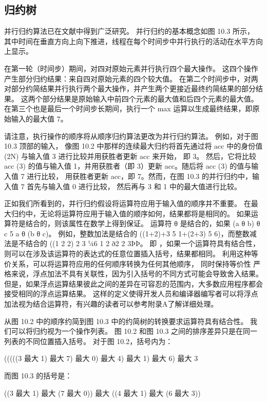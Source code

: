 \subsection{归约树}
并行归约算法已在文献中得到广泛研究。 并行归约的基本概念如图 10.3 所示，
其中时间在垂直方向上向下推进，线程在每个时间步中并行执行的活动在水平方向上显示。

在第一轮（时间步）期间，对四对原始元素并行执行四个最大操作。 这四个操作产生部分归约结果：来自四对原始元素的四个较大值。 
在第二个时间步中，对两对部分约简结果并行执行两个最大操作，并产生两个更接近最终约简结果的部分结果。 
这两个部分结果是原始输入中前四个元素的最大值和后四个元素的最大值。 
在第三个也是最后一个时间步长期间，执行一个 max 运算以生成最终结果，即原始输入的最大值 7。

请注意，执行操作的顺序将从顺序归约算法更改为并行归约算法。 
例如，对于图 10.3 顶部的输入，
像图 10.2 中那样的连续最大归约将首先通过将 acc 中的身份值 (2N) 与输入值 3 进行比较并用获胜者更新 acc 来开始， 即 3。
然后，它将比较 acc (3) 的值与输入值 1，并用获胜者（即 3）更新 acc。随后将 acc (3) 的值与输入值 7 进行比较， 
用获胜者更新 acc，即 7。然而，在图 10.3 的并行归约中，输入值 7 首先与输入值 0 进行比较，
然后再与 3 和 1 中的最大值进行比较。

正如我们所看到的，并行归约假设将运算符应用于输入值的顺序并不重要。 
在最大归约中，无论将运算符应用于输入值的顺序如何，结果都将是相同的。 如果运算符是结合的，则该属性在数学上得到保证。 
运算符 θ 是结合的，如果 (a θ b) θ c 5 a θ (b θ c)。 
例如，整数加法是结合的 ((1+2)+3 5 1+(2+3) 5 6)，而整数减法是不结合的 ((1 2 2) 2 3 ¼6 1 2 ð2 2 3ÞÞ。
即 ，如果一个运算符具有结合性，则可以在涉及该运算符的表达式的任意位置插入括号，结果都相同。
利用这种等价关系，可以将运算符应用的任何顺序转换为任何其他顺序，
同时保持等价性 严格来说，浮点加法不具有关联性，因为引入括号的不同方式可能会导致舍入结果。
但是，如果浮点运算结果彼此之间的差异在可容忍的范围内，大多数应用程序都会接受相同的浮点运算结果。 
这样的定义使得开发人员和编译器编写者可以将浮点加法视为结合运算符，有兴趣的读者可以参考附录A了解详细处理。

从图 10.2 中的顺序约简到图 10.3 中的约简树的转换要求运算符具有结合性。 我们可以将归约视为一个操作列表。 
图 10.2 和图 10.3 之间的排序差异只是在同一列表的不同位置插入括号。 对于图 10.2，括号内为：

(((((3 最大 1) 最大 7) 最大 0) 最大 4) 最大 1) 最大 6) 最大 3

而图 10.3 的括号是：

((3 最大 1) 最大 (7 最大 0)) 最大 ((4 最大 1) 最大 (6 最大 3))

